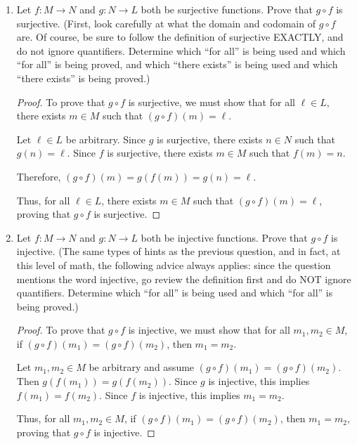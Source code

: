 \documentclass{article}
\begin{document}
\begin{enumerate}

\item Let $f : M \to N$ and $g: N \to L$ both be surjective functions. Prove that $g  \circ f$ is surjective. (First, look carefully at what the domain and codomain of $g \circ f$ are. Of course, be sure to follow the definition of surjective EXACTLY, and do not ignore quantifiers. Determine which ``for all'' is being used and which ``for all'' is being proved, and which ``there exists'' is being used and which ``there exists'' is being proved.)

\begin{proof}
    To prove that $g \circ f$ is surjective, we must show that for all $\ell \in L$, there exists $m \in M$ such that $(g \circ f)(m) = \ell$.

    Let $\ell \in L$ be arbitrary.
    Since $g$ is surjective, there exists $n \in N$ such that $g(n) = \ell$.
    Since $f$ is surjective, there exists $m \in M$ such that $f(m) = n$.

    Therefore, $(g \circ f)(m) = g(f(m)) = g(n) = \ell$.

    Thus, for all $\ell \in L$, there exists $m \in M$ such that $(g \circ f)(m) = \ell$, proving that $g \circ f$ is surjective.
\end{proof}

\newpage

\item Let $f : M \to N$ and $g: N \to L$ both be injective functions. Prove that $g  \circ f$ is injective. (The same types of hints as the previous question, and in fact, at this level of math, the following advice always applies: since the question mentions the word injective, go review the definition first and do NOT ignore quantifiers. Determine which ``for all'' is being used and which ``for all'' is being proved.)

\begin{proof}
    To prove that $g \circ f$ is injective, we must show that for all $m_1, m_2 \in M$, if $(g \circ f)(m_1) = (g \circ f)(m_2)$, then $m_1 = m_2$.

    Let $m_1, m_2 \in M$ be arbitrary and assume $(g \circ f)(m_1) = (g \circ f)(m_2)$.
    Then $g(f(m_1)) = g(f(m_2))$.
    Since $g$ is injective, this implies $f(m_1) = f(m_2)$.
    Since $f$ is injective, this implies $m_1 = m_2$.

    Thus, for all $m_1, m_2 \in M$, if $(g \circ f)(m_1) = (g \circ f)(m_2)$, then $m_1 = m_2$, proving that $g \circ f$ is injective.
\end{proof}


\end{enumerate}
\end{document}
